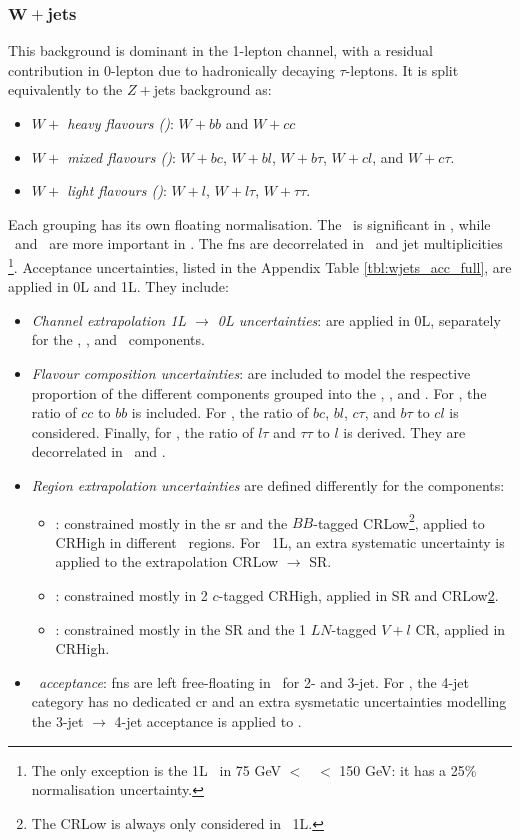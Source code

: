 \subsubsection{$\boldsymbol{W+}$jets}
This background is dominant in the 1-lepton channel, with a residual contribution in 0-lepton due to hadronically decaying $\tau$-leptons. It is split equivalently to the $Z+$jets background as:   
\begin{itemize}
    \item \textit{$W+$ heavy flavours (\whf)}: $W+bb$ and $W+cc$
    \item \textit{$W+$ mixed flavours (\wmf)}: $W+bc$, $W+bl$, $W+b\tau$, $W+cl$, and $W+c\tau$.
    \item \textit{$W+$ light flavours (\wlf)}: $W+l$, $W+l\tau$, $W+\tau\tau$.
\end{itemize}
Each grouping has its own floating normalisation. The \whf\ is significant in \vhb, while \wmf\ and \wlf\ are more important in \vhc. The \glspl{fn} are decorrelated in \ptv\ and jet multiplicities \nj\footnote{The only exception is the 1L \wlf\ in 75 GeV $<$ \ptv\ $<$ 150 GeV: it has a 25\% normalisation uncertainty.}. Acceptance uncertainties, listed in the Appendix Table \ref{tbl:wjets_acc_full}, are applied in 0L and 1L. They include:
\begin{itemize}[leftmargin=*]
    \item \textit{Channel extrapolation 1L $\rightarrow$ 0L uncertainties}: are applied in 0L, separately for the \whf, \wmf, and \wlf\ components. 
    \item \textit{Flavour composition uncertainties}: are included to model the respective proportion of the different components grouped into the \whf, \wmf, and \wlf. For \whf, the ratio of $cc$ to $bb$ is included. For \wmf, the ratio of $bc$, $bl$, $c\tau$, and $b\tau$ to $cl$ is considered. Finally, for  \wlf, the ratio of $l\tau$ and $\tau\tau$ to $l$ is derived. They are decorrelated in \ptv\ and \nj.
    \item \textit{Region extrapolation uncertainties} are defined differently for the components:
    \begin{itemize}
        \item \whf: constrained mostly in the \gls{sr} and the $BB$-tagged CRLow\footnote{\label{footnote-crlow}The CRLow is always only considered in \vhb\ 1L.}, applied to CRHigh in different \ptv\ regions. For \vhb\ 1L, an extra systematic uncertainty is applied to the extrapolation CRLow $\rightarrow$ SR. 
        \item \wmf: constrained mostly in 2 $c$-tagged CRHigh, applied in SR and CRLow\cref{footnote-crlow}.
        \item \wlf: constrained mostly in the SR and the 1 $LN$-tagged $V+l$ CR, applied in CRHigh. 
    \end{itemize}
    \item \textit{\nj\ acceptance}: \glspl{fn} are left free-floating in \nj\ for 2- and 3-jet. For \vhb, the 4-jet category has no dedicated \gls{cr} and an extra sysmetatic uncertainties modelling the 3-jet $\rightarrow$ 4-jet acceptance is applied to \whf.
\end{itemize}
